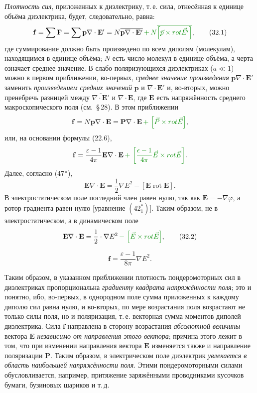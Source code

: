 \documentclass[a4paper,10pt]{article}
\newcommand{\redtext}[1]{\textcolor{redcolor}{#1}}
\newcommand{\modtext}[1]{\textcolor{modcolor}{#1}}
\newcommand{\modmath}[1]{\textcolor{modcolor}{#1}}
\begin{document}
\textit{Плотность сил}, приложенных к диэлектрику, т.\,е. сила,
отнесённая к единице объёма диэлектрика, будет, следовательно, равна:
\begin{equation}
    \mathbf{f} = \sum\mathbf{F} = \sum\mathbf{p}\nabla\cdot\mathbf{E}'
              = N\overline{\mathbf{p}\nabla\cdot\mathbf{E}'} \modmath{\,+\, N\overline{\left[\vec{p} \times rot \vec{E'}\right]}},
    \tag{32.1}
\end{equation}
где суммирование должно быть произведено по всем диполям (молекулам),
находящимся в единице объёма; $N$ есть число молекул в единице объёма,
а черта означает среднее значение. В слабо поляризующихся диэлектриках
($a \ll 1$) можно в первом приближении, во-первых, \textit{среднее
значение произведения} $\mathbf{p}\nabla\cdot\mathbf{E}'$ заменить
\textit{произведением средних значений} $\mathbf{p}$ и
$\nabla\cdot\mathbf{E}'$ и, во-вторых, можно пренебречь
разницей между $\overline{\nabla\cdot\mathbf{E}'}$ и $\nabla\cdot\mathbf{E}$,
где $\mathbf{E}$ есть напряжённость среднего макроскопического поля
(см.\ §\,28). В этом приближении
$$
    \mathbf{f} = N\mathbf{p}\nabla\cdot\mathbf{E} = \mathbf{P}\nabla\cdot\mathbf{E} \modmath{\,+\, \left[\vec{P} \times rot \vec{E}\right]},
$$
или, на основании формулы (22.6),
$$
    \mathbf{f} = \frac{\varepsilon-1}{4\pi}\mathbf{E}\nabla\cdot\mathbf{E} \modmath{\,+\, \left[\frac{\epsilon - 1}{4 \pi}\vec{E} \times rot \vec{E}\right]}.
$$
Далее, согласно (47*),
$$
    \mathbf{E}\nabla\cdot\mathbf{E}
    = \frac{1}{2}\nabla E^2 - [\mathbf{E}\operatorname{rot}\mathbf{E}].
$$
В электростатическом поле последний член равен нулю, так как
$\mathbf{E} = -\nabla\varphi$, а ротор градиента равен нулю [уравнение
$(42^*_1)$]. Таким образом, \modtext{не} в \redtext{электростатическом}\modtext{, а в динамическом} поле
\begin{equation}
    \mathbf{E}\nabla\cdot\mathbf{E} = \frac{1}{2}\cdot\nabla E^2 \modmath{\,-\, \left[\vec{E} \times rot \vec{E}\right]},
    \tag{32.2}
\end{equation}

\begin{equation}
    \mathbf{f} = \frac{\varepsilon-1}{8\pi}\nabla E^2.
    \tag{32.3}
\end{equation}



Таким образом, в указанном приближении плотность пондеромоторных сил в
диэлектриках пропорциональна \textit{градиенту квадрата напряжённости
поля}; это и понятно, ибо, во-первых, в однородном поле сумма
приложенных к каждому диполю сил равна нулю, и во-вторых, по мере
возрастания поля возрастают не только силы поля, но и поляризация,
т.\,е. векторная сумма моментов диполей диэлектрика. Сила $\mathbf{f}$
направлена в сторону возрастания \textit{абсолютной величины} вектора
$\mathbf{E}$ \textit{независимо от направления этого вектора}; причина
этого лежит в том, что при изменении направления вектора $\mathbf{E}$
изменяется также и направление поляризации $\mathbf{P}$. Таким образом,
в электрическом поле диэлектрик \textit{увлекается в область наибольшей
напряжённости поля}. Этими пондеромоторными силами обусловливается,
например, притяжение заряжёнными проводниками кусочков бумаги,
бузиновых шариков и т.\,д.
\end{document}
